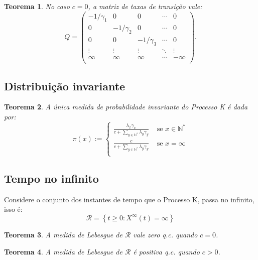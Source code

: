 \documentclass[xcolor=pdftex,dvipsnames]{beamer}
\newcommand{\RR}{{\mathcal{R}}}
\newcommand{\Nz}{{\mathbb{N^*}}}
\newcommand{\qc}{{\emph{q.c.}} }
\newtheorem{teorema}{Teorema}
\begin{document}
\begin{frame}
  \begin{teorema}
    No caso $c = 0$, a matriz de taxas de transição vale:
    \begin{displaymath}
      Q = \left(
        \begin{array}{ccccc}
          -1/\gamma_1 & 0 & 0 & \cdots & 0\\
          0 & -1/\gamma_2 & 0 & \cdots & 0\\
          0 & 0 & -1/\gamma_3 & \cdots & 0\\
          \vdots & \vdots & \vdots & \ddots & \vdots \\
          \infty & \infty & \infty & \cdots & -\infty\\
        \end{array}
      \right).
    \end{displaymath}
  \end{teorema}
\end{frame}

\subsection{Distribuição invariante}

\begin{frame}
  \begin{teorema}
    A única medida de probabilidade invariante do Processo K é dada
    por:
    \begin{displaymath}
      \pi(x) := \begin{cases}
        \frac{\lambda_x \gamma_x}{c + \sum_{y \in \Nz} \lambda_y \gamma_y}
        & \textrm{ se } x \in \Nz \\
        \frac{c}{c + \sum_{y \in \Nz} \lambda_y \gamma_y}
        & \textrm{ se } x = \infty \\
      \end{cases}
    \end{displaymath}
  \end{teorema}
\end{frame}

\subsection{Tempo no infinito}

\begin{frame}

  Considere o conjunto dos instantes de tempo que o Processo K, passa
  no infinito, isso é:
  \begin{displaymath}
    \RR = \left\{ t \geq 0: X^\infty(t) = \infty \right\}
  \end{displaymath}
  \pause
  \begin{teorema}
    A medida de Lebesgue de $\RR$ vale zero \qc quando $c = 0$.
  \end{teorema}
  \begin{teorema}
    A medida de Lebesgue de $\RR$ é positiva \qc quando $c > 0$.
  \end{teorema}
\end{frame}
\end{document}
